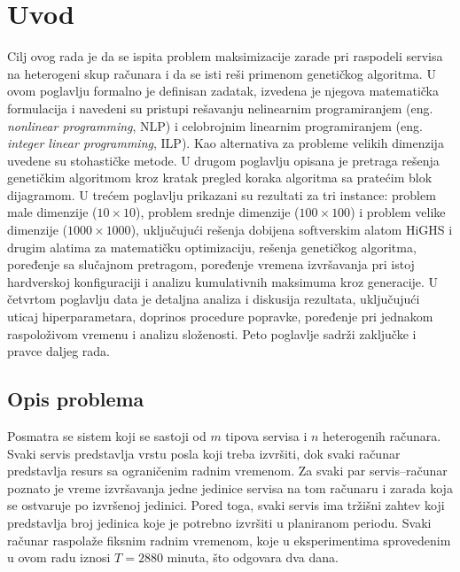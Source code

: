 \documentclass[12pt]{article}
\begin{document}


\pagestyle{fancy}
\fancyhead{}
\clearpage

\pagebreak

\tableofcontents

\pagebreak

\section{Uvod}\label{sec:uvod}

Cilj ovog rada je da se ispita problem maksimizacije zarade pri raspodeli servisa na heterogeni skup računara i da se isti reši primenom genetičkog algoritma. U ovom poglavlju formalno je definisan zadatak, izvedena je njegova matematička formulacija i navedeni su pristupi rešavanju nelinearnim programiranjem (eng. \textit{nonlinear programming}, NLP) i celobrojnim linearnim programiranjem (eng. \textit{integer linear programming}, ILP). Kao alternativa za probleme velikih dimenzija uvedene su stohastičke metode. U drugom poglavlju opisana je pretraga rešenja genetičkim algoritmom kroz kratak pregled koraka algoritma sa pratećim blok dijagramom. U trećem poglavlju prikazani su rezultati za tri instance: problem male dimenzije ($10 \times 10$), problem srednje dimenzije ($100 \times 100$) i problem velike dimenzije ($1000 \times 1000$), uključujući rešenja dobijena softverskim alatom HiGHS i drugim alatima za matematičku optimizaciju, rešenja genetičkog algoritma, poređenje sa slučajnom pretragom, poređenje vremena izvršavanja pri istoj hardverskoj konfiguraciji i analizu kumulativnih maksimuma kroz generacije. U četvrtom poglavlju data je detaljna analiza i diskusija rezultata, uključujući uticaj hiperparametara, doprinos procedure popravke, poređenje pri jednakom raspoloživom vremenu i analizu složenosti. Peto poglavlje sadrži zaključke i pravce daljeg rada.

\subsection{Opis problema}

Posmatra se sistem koji se sastoji od $m$ tipova servisa i $n$ heterogenih računara. Svaki servis predstavlja vrstu posla koji treba izvršiti, dok svaki računar predstavlja resurs sa ograničenim radnim vremenom. Za svaki par servis–računar poznato je vreme izvršavanja jedne jedinice servisa na tom računaru i zarada koja se ostvaruje po izvršenoj jedinici. Pored toga, svaki servis ima tržišni zahtev koji predstavlja broj jedinica koje je potrebno izvršiti u planiranom periodu. Svaki računar raspolaže fiksnim radnim vremenom, koje u eksperimentima sprovedenim u ovom radu iznosi $T = 2880$ minuta, što odgovara dva dana.
\end{document}
